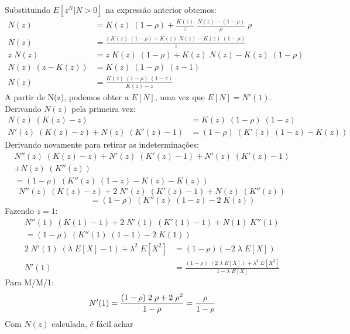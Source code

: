 \documentclass[a4paper]{article}
\newcommand{\E}[1]{E\!\left[#1\right]}
\begin{document}
Substituindo \(\E{z^N | N > 0}\)
na expressão anterior obtemos:
\begin{align*}
    N(z) &= K(z) \; (1 - \rho)
        + \frac{K(z)}{z} \; \frac{N(z) - (1 - \rho)}{\rho}
        \; \rho \\
    N(z) &= \frac{z \; K(z) \; (1 - \rho)
        + K(z) \; N(z) - K(z) \; (1 - \rho)}{z} \\
    z \; N(z) &= z \; K(z) \; (1 - \rho)
        + K(z) \; N(z) - K(z) \; (1 - \rho) \\
    N(z) \; (z - K(z)) &= K(z) \; (1 - \rho) \; (z - 1) \\
    N(z) &= \frac{K(z) \; (1 - \rho) \; (1 - z)}{K(z) - z}
\end{align*}
A partir de N(z),
podemos obter a \(\E{N}\),
uma vez que \(\E{N} = N'(1)\).
Derivando \(N(z)\) pela primeira vez:
\begin{align*}
    N(z) \; (K(z) - z) &= K(z) \; (1 - \rho) \; (1-z) \\
    N'(z) \; (K(z) - z) +  N(z) \; (K'(z) - 1)
        &= (1 - \rho) \; (K'(z) \; (1 - z) - K(z))
\end{align*}
Derivando novamente para retirar as indeterminações:
\begin{align*}
    N''(z) \; (K(z) - z) + N'(z) \; (K'(z) - 1)
        + N'(z) \; (K'(z) - 1) \\
        + N(z) \; (K''(z)) \\
    = (1 - \rho) \; (K''(z) \; (1 - z) - K(z) - K(z))
\end{align*}
\[
   N''(z) \; (K(z) - z) + 2 \; N'(z) \; (K'(z) - 1)
        + N(z) \; (K''(z))
\] \[
    \qquad\qquad \quad
    = (1 - \rho) \; (K''(z) \; (1 - z) - 2 \; K(z))
\]
Fazendo \(z = 1\):
\begin{align*}
    N''(1) \; (K(1) - 1) + 2 \; N'(1) \; (K'(1) - 1)
        + N(1) \; K''(1) \\
        = (1 - \rho) \; (K''(1) \; (1 - 1) - 2 \; K(1))
\end{align*} \begin{align*}
    2 \; N'(1) \; (\lambda \; \E{X} - 1)
        + \lambda^2 \; \E{X^2}
        &= (1 - \rho)(- 2 \; \lambda \; \E{X}) \\
    N'(1) &= \frac{(1 - \rho) \; (2 \; \lambda \; \E{X})
        + \lambda^2 \; \E{X^2}}{1 - \lambda \; \E{X}}
\end{align*}
Para M/M/1:
\[
    N'(1) = \frac{(1 - \rho) \; 2 \; \rho
        + 2 \; \rho^2}{1 - \rho} \\
        = \frac{\rho}{1 - \rho}
\]
Com \(N(z)\) calculada, é fácil achar
\end{document}
